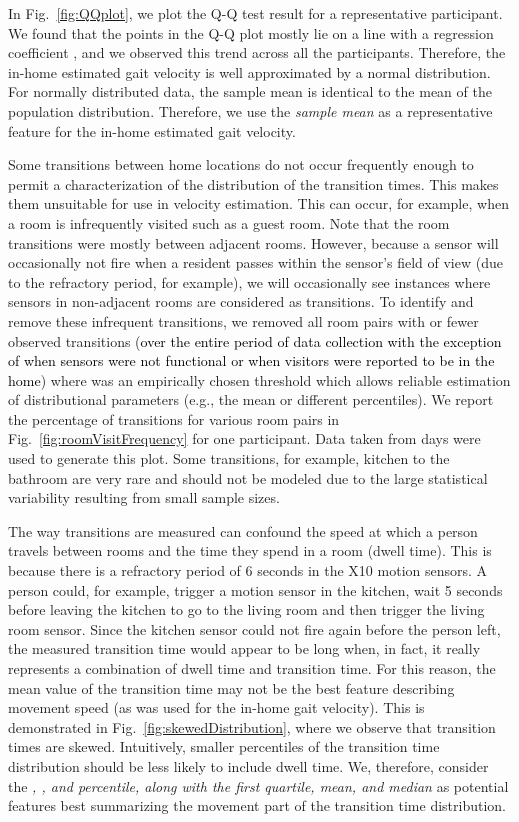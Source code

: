 \documentclass[journal]{IEEEtran}
\newcommand{\ca}[1]{\textcolor{black}{#1}}
\begin{document}
In Fig.~\ref{fig:QQplot}, we plot the Q-Q test result for a representative participant. We found that the points in the Q-Q plot mostly lie on a line with a regression coefficient , and we observed this trend across all the participants. Therefore, the in-home estimated gait velocity is well approximated by a normal distribution. For normally distributed data, the sample mean is identical to the mean of the population distribution. Therefore, we use the \emph{sample mean} as a representative feature for the in-home estimated gait velocity. 


Some transitions between home locations do not occur frequently enough to permit a characterization of the distribution of the transition times.  This makes them unsuitable for use in velocity estimation.  This can occur, for example, when a room is infrequently visited such as a guest room. Note that the room transitions were mostly between adjacent rooms. However, because a sensor will occasionally not fire when a resident passes within the sensor’s field of view (due to the refractory period, for example), we will occasionally see instances where sensors in non-adjacent rooms are considered as transitions. To identify and remove these infrequent transitions, we removed all room pairs with  or fewer observed transitions (\ca{over the entire period of data collection with the exception of when sensors were not functional or when visitors were reported to be in the home}) where  was an empirically chosen threshold which allows reliable estimation of distributional parameters (e.g., the mean or different percentiles). We report the percentage of transitions for various room pairs in Fig.~\ref{fig:roomVisitFrequency} for one participant. Data taken from  days were used to generate this plot. 
Some transitions, for example, kitchen to the bathroom are very rare and should not be modeled due to the large statistical variability resulting from small sample sizes.


The way transitions are measured can confound the speed at which a person travels between rooms and the time they spend in a room (dwell time).  This is because there is a refractory period of 6 seconds in the X10 motion sensors.  A person could, for example, trigger a motion sensor in the kitchen, wait 5 seconds before leaving the kitchen to go to the living room and then trigger the living room sensor.  Since the kitchen sensor could not fire again before the person left, the measured transition time would appear to be long when, in fact, it really represents a combination of dwell time and transition time.  For this reason, the mean value of the transition time may not be the best feature describing movement speed (as was used for the in-home gait velocity). This is demonstrated in Fig.~\ref{fig:skewedDistribution}, where we observe that
transition times are skewed.  Intuitively, smaller percentiles of the transition time distribution should be less likely to include dwell time. We, therefore, consider the \emph{, , and  percentile, along with the  first quartile, mean, and median }as potential features best summarizing the movement part of the transition time distribution.
\end{document}
